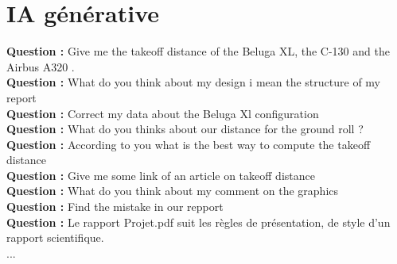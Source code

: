 

\clearpage
\appendix



\chapter{IA générative}

\textbf{Question :} Give me the takeoff distance of the Beluga XL, the C-130 and the Airbus A320 . \\
\textbf{Question  :} What do you think about my design i mean the structure of my report \\
\textbf{Question  :} Correct my data about the Beluga Xl configuration \\
\textbf{Question  :} What do you thinks about our distance for the ground roll ?\\
\textbf{Question  :}  According to you what is the best way to compute the takeoff distance \\
\textbf{Question  :} Give me some link of an article on takeoff distance \\
\textbf{Question  :} What do you think about my comment on the graphics \\
\textbf{Question  : } Find the mistake in our repport \\
\textbf{Question  :}  Le rapport Projet.pdf suit les règles de présentation, de style d'un rapport scientifique. \\

...